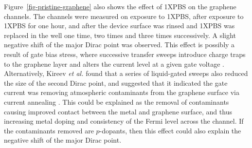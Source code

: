 \documentclass[
  a4paper,
]{scrbook}
\begin{document}
Figure~\ref{fig-pristine-graphene} also shows the effect of 1XPBS on the
graphene channels. The channels were measured on exposure to 1XPBS,
after exposure to 1XPBS for one hour, and after the device surface was
rinsed and 1XPBS was replaced in the well one time, two times and three
times successively. A slight negative shift of the major Dirac point was
observed. This effect is possibly a result of gate bias stress, where
successive transfer sweeps introduce charge traps to the graphene layer
and alters the current level at a given gate voltage
\autocite{Bargaoui2018,Noyce2019}. Alternatively, Kireev \emph{et al.}
found that a series of liquid-gated sweeps also reduced the size of the
second Dirac point, and suggested that it indicated the gate current was
removing atmospheric contaminants from the graphene surface via current
annealing \autocite{Kireev2017}. This could be explained as the removal
of contaminants causing improved contact between the metal and graphene
surface, and thus increasing metal doping and consistency of the Fermi
level across the channel. If the contaminants removed are \(p\)-dopants,
then this effect could also explain the negative shift of the major
Dirac point.
\end{document}
